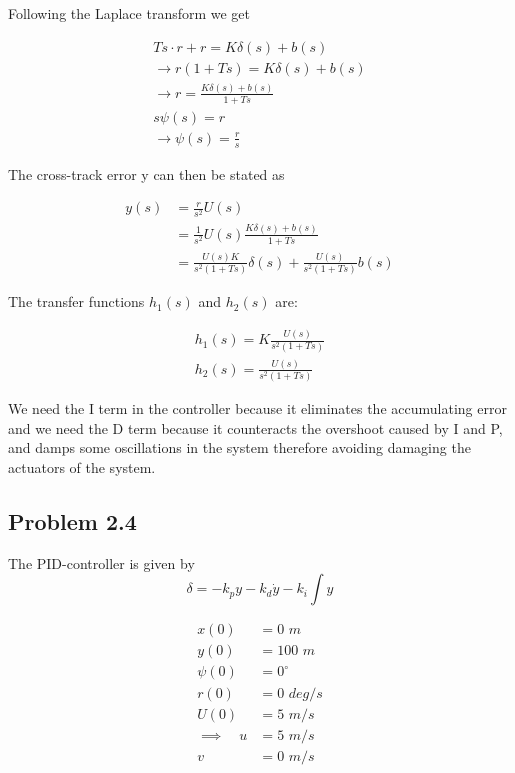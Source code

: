 Following the Laplace transform we get

\begin{align}
    Ts\cdot r + r = K\delta (s) + b(s) \\
    \rightarrow r(1+Ts) = K\delta (s) + b(s) \\
    \rightarrow r = \frac{K\delta (s) + b(s)}{1 + Ts} \\
    s\psi (s) = r \\
    \rightarrow \psi (s) = \frac{r}{s}
\end{align}

The cross-track error y can then be stated as

\begin{align}
    y(s) &= \frac{r}{s^2}U(s)\\
    &= \frac{1}{s^2}U(s)\frac{K\delta (s) + b(s)}{1+ Ts} \\
    &= \frac{U(s)K}{s^2(1+Ts)}\delta (s) + \frac{U(s)}{s^2(1+Ts)}b(s)
\end{align}

The transfer functions $h_1(s)$ and $h_2(s)$ are:

\begin{align}
    h_1(s) = K\frac{U(s)}{s^2(1+Ts)} \\
    h_2(s) = \frac{U(s)}{s^2(1+Ts)}
\end{align}

We need the I term in the controller because it eliminates the accumulating error and we need the D term because it counteracts the overshoot caused by I and P, and damps some oscillations in the system therefore avoiding damaging the actuators of the system. \\

\subsection*{Problem 2.4}


The PID-controller is given by 
\begin{equation}
	\delta = -k_p y - k_d \dot{y} - k_i \int y
\end{equation}

\begin{align}
    {x}(0) &= 0 \textit{ m} \\
    {y}(0) &= 100 \textit{ m} \\
    {\psi}(0) &= 0^{\circ} \\
    {r}(0) &= 0 \textit{ deg/s} \\
    {U}(0) &= 5 \textit{ m/s} \\
    \implies \quad u &= 5 \textit{ m/s} \\
    v &= 0 \textit{ m/s}
\end{align}


